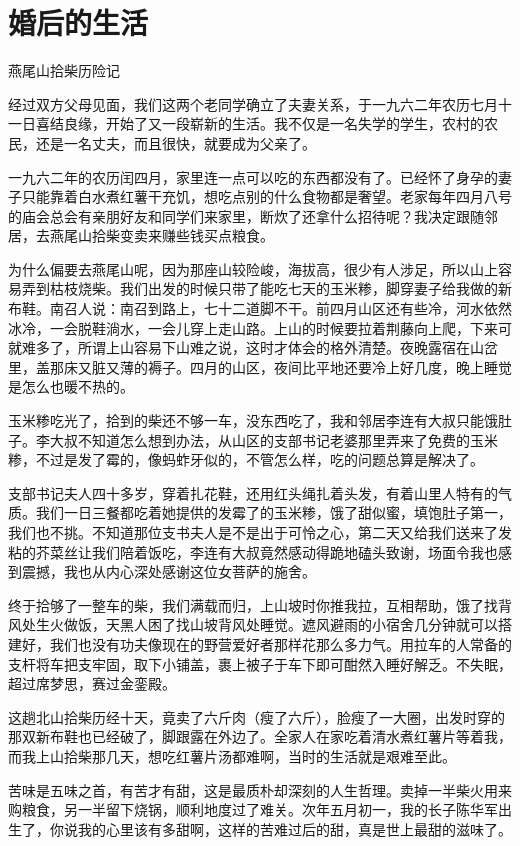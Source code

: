 \chapter{婚后的生活}

燕尾山拾柴历险记

经过双方父母见面，我们这两个老同学确立了夫妻关系，于一九六二年农历七月十一日喜结良缘，开始了又一段崭新的生活。我不仅是一名失学的学生，农村的农民，还是一名丈夫，而且很快，就要成为父亲了。

一九六二年的农历闰四月，家里连一点可以吃的东西都没有了。已经怀了身孕的妻子只能靠着白水煮红薯干充饥，想吃点别的什么食物都是奢望。老家每年四月八号的庙会总会有亲朋好友和同学们来家里，断炊了还拿什么招待呢？我决定跟随邻居，去燕尾山拾柴变卖来赚些钱买点粮食。

为什么偏要去燕尾山呢，因为那座山较险峻，海拔高，很少有人涉足，所以山上容易弄到枯枝烧柴。我们出发的时候只带了能吃七天的玉米糁，脚穿妻子给我做的新布鞋。南召人说：南召到路上，七十二道脚不干。前四月山区还有些冷，河水依然冰冷，一会脱鞋淌水，一会儿穿上走山路。上山的时候要拉着荆藤向上爬，下来可就难多了，所谓上山容易下山难之说，这时才体会的格外清楚。夜晚露宿在山岔里，盖那床又脏又薄的褥子。四月的山区，夜间比平地还要冷上好几度，晚上睡觉是怎么也暖不热的。

玉米糁吃光了，拾到的柴还不够一车，没东西吃了，我和邻居李连有大叔只能饿肚子。李大叔不知道怎么想到办法，从山区的支部书记老婆那里弄来了免费的玉米糁，不过是发了霉的，像蚂蚱牙似的，不管怎么样，吃的问题总算是解决了。

支部书记夫人四十多岁，穿着扎花鞋，还用红头绳扎着头发，有着山里人特有的气质。我们一日三餐都吃着她提供的发霉了的玉米糁，饿了甜似蜜，填饱肚子第一，我们也不挑。不知道那位支书夫人是不是出于可怜之心，第二天又给我们送来了发粘的芥菜丝让我们陪着饭吃，李连有大叔竟然感动得跪地磕头致谢，场面令我也感到震撼，我也从内心深处感谢这位女菩萨的施舍。

终于拾够了一整车的柴，我们满载而归，上山坡时你推我拉，互相帮助，饿了找背风处生火做饭，天黑人困了找山坡背风处睡觉。遮风避雨的小宿舍几分钟就可以搭建好，我们也没有功夫像现在的野营爱好者那样花那么多力气。用拉车的人常备的支杆将车把支牢固，取下小铺盖，裹上被子于车下即可酣然入睡好解乏。不失眠，超过席梦思，赛过金銮殿。

这趟北山拾柴历经十天，竟卖了六斤肉（瘦了六斤），脸瘦了一大圈，出发时穿的那双新布鞋也已经破了，脚跟露在外边了。全家人在家吃着清水煮红薯片等着我，而我上山拾柴那几天，想吃红薯片汤都难啊，当时的生活就是艰难至此。

苦味是五味之首，有苦才有甜，这是最质朴却深刻的人生哲理。卖掉一半柴火用来购粮食，另一半留下烧锅，顺利地度过了难关。次年五月初一，我的长子陈华军出生了，你说我的心里该有多甜啊，这样的苦难过后的甜，真是世上最甜的滋味了。

